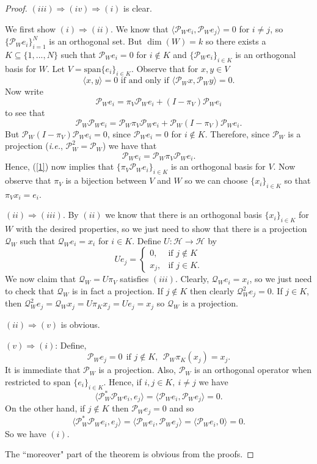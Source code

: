 \documentclass[11pt,reqno]{amsart}
\theoremstyle{remark}
\begin{document}
\begin{proof}
$(iii)\Rightarrow(iv)\Rightarrow(i)$ is clear.

We first show $(i)\Rightarrow(ii)$.  We know that $\langle\mathcal{P}_We_i,\mathcal{P}_We_j\rangle=0$ for $i\neq j$, so $\{\mathcal{P}_We_i\}_{i=1}^N$ is an orthogonal set.  But $\dim(W)=k$ so there exists a $K\subseteq\{1,...,N\}$ such that $\mathcal{P}_We_i=0$ for $i\not\in K$ and $\{\mathcal{P}_We_i\}_{i\in K}$ is an orthogonal basis for $W$.  Let $V=\text{span}\{e_i\}_{i\in K}$.  Observe that for $x,y\in V$
\begin{equation}\label{1}
\langle x,y\rangle=0 \mbox{ if and only if } \langle \mathcal{P}_Wx,\mathcal{P}_Wy\rangle=0.
\end{equation}
Now write
$$
\mathcal{P}_We_i=\pi_V\mathcal{P}_We_i+(I-\pi_V)\mathcal{P}_We_i
$$
to see that
$$
\mathcal{P}_W\mathcal{P}_We_i=\mathcal{P}_W\pi_V\mathcal{P}_We_i+\mathcal{P}_W(I-\pi_V)\mathcal{P}_We_i.
$$
But $\mathcal{P}_W(I-\pi_V)\mathcal{P}_We_i=0$, since $\mathcal{P}_We_i=0$ for $i\not\in K$.  Therefore, since $\mathcal{P}_W$ is a projection (\textit{i.e.}, $\mathcal{P}_W^2=\mathcal{P}_W$) we have that
$$
\mathcal{P}_We_i=\mathcal{P}_W\pi_V\mathcal{P}_We_i.
$$
Hence, (\ref{1}) now implies that $\{\pi_V\mathcal{P}_We_i\}_{i\in K}$ is an orthogonal basis for $V$.  Now observe that $\pi_V$ is a bijection between $V$ and $W$ so we can choose $\{x_i\}_{i\in K}$ so that $\pi_Vx_i=e_i$.

$(ii)\Rightarrow(iii)$.  By $(ii)$ we know that there is an orthogonal basis $\{x_i\}_{i\in K}$ for $W$ with the desired properties, so we just need to show that there is a projection $\mathcal{Q}_W$ such that $\mathcal{Q}_We_i=x_i$ for $i\in K$.  Define $U:\mathcal{H}\rightarrow\mathcal{H}$ by
$$
Ue_j = \begin{cases} 0, & \mbox{if } j\not\in K \\ x_j, & \mbox{if } j\in K. \end{cases}
$$
We now claim that $\mathcal{Q}_W=U\pi_V$ satisfies $(iii)$.  Clearly, $\mathcal{Q}_We_i=x_i$, so we just need to check that $\mathcal{Q}_W$ is in fact a projection.  If $j\not\in K$ then clearly $\mathcal{Q}_W^2e_j=0$.  If $j\in K$, then $\mathcal{Q}_{W}^2e_j=\mathcal{Q}_{W}x_j=U\pi_Kx_j=Ue_j=x_j$ so $\mathcal{Q}_W$ is a projection.

$(ii) \Rightarrow (v)$ is obvious.

$(v) \Rightarrow (i)$:  Define,
\[ {\mathcal P}_We_j = 0 \ \ \mbox{if $j\notin K$},\ \ {\mathcal P}_W\pi_K(x_j) = x_j.\]
It is immediate that ${\mathcal P}_W$ is a projection.  Also, ${\mathcal P}_W$ is an orthogonal operator
when restricted to span $\{e_i\}_{i\in K}$.  Hence, if $i,j\in K,\ i\not= j$ we have
\[ \langle {\mathcal P}_W^*{\mathcal P}_We_i,e_j\rangle = \langle {\mathcal P}_We_i,{\mathcal P}_We_j\rangle =0.\]
On the other hand, if $j\notin K$ then ${\mathcal P}_We_j = 0$ and so
\[ \langle {\mathcal P}_W^*{\mathcal P}_We_i,e_j\rangle = \langle {\mathcal P}_We_i,{\mathcal P}_We_j\rangle
= \langle {\mathcal P}_We_i,0\rangle =0.\]
So we have $(i)$.

The ``moreover" part of the theorem is obvious from the proofs.
\end{proof}
\end{document}
